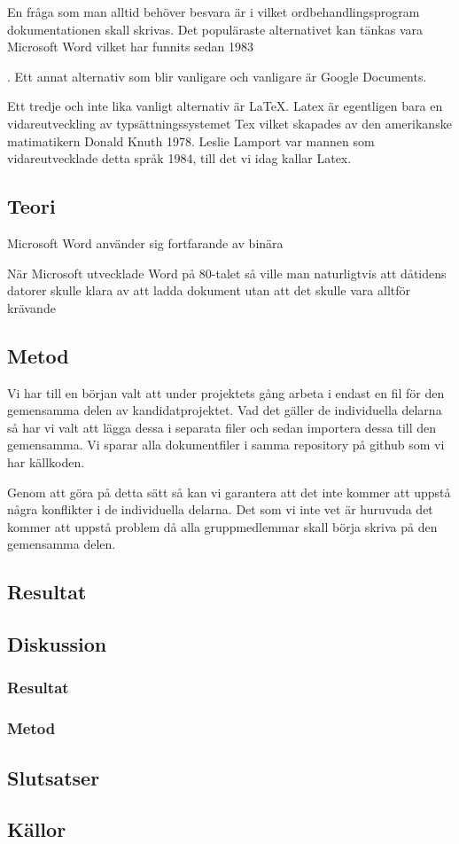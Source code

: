 En fråga som man alltid behöver besvara är i vilket ordbehandlingsprogram dokumentationen skall skrivas. Det populäraste 
alternativet kan tänkas vara Microsoft Word vilket har funnits sedan 1983 \begin{comment} källa! \end{comment}. Ett annat 
alternativ som blir vanligare och vanligare är Google Documents.

Ett tredje och inte lika vanligt alternativ är \LaTeX. Latex är egentligen bara en vidareutveckling av typsättningssystemet 
Tex vilket skapades av den amerikanske matimatikern Donald Knuth 1978. Leslie Lamport var mannen som vidareutvecklade detta 
språk 1984, till det vi idag kallar Latex.

\subsection{Teori}
Microsoft Word använder sig fortfarande av binära

När Microsoft utvecklade Word på 80-talet så ville man naturligtvis att dåtidens datorer skulle klara av att ladda 
dokument utan att det skulle vara alltför krävande

\subsection{Metod}
Vi har till en början valt att under projektets gång arbeta i endast en fil för den gemensamma delen av kandidatprojektet. Vad det gäller 
de individuella delarna så har vi valt att lägga dessa i separata filer och sedan importera dessa till den gemensamma. Vi 
sparar alla dokumentfiler i samma repository på github som vi har källkoden.

Genom att göra på detta sätt så kan vi garantera att det inte kommer att uppstå några konflikter i de individuella delarna.
Det som vi inte vet är huruvuda det kommer att uppstå problem då alla gruppmedlemmar skall börja skriva på den gemensamma delen.

\subsection{Resultat}
\subsection{Diskussion}
\subsubsection{Resultat}
\subsubsection{Metod}
\subsection{Slutsatser}
\subsection{Källor}
